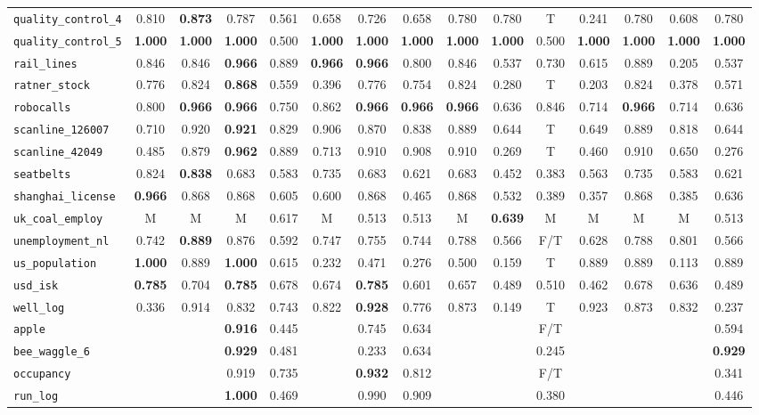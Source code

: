 \begin{tabular}{lcccccccccccccc}
\verb+quality_control_4+ & 0.810 & \textbf{0.873} & 0.787 & 0.561 & 0.658 & 0.726 & 0.658 & 0.780 & 0.780 & T & 0.241 & 0.780 & 0.608 & 0.780\\
\verb+quality_control_5+ & \textbf{1.000} & \textbf{1.000} & \textbf{1.000} & 0.500 & \textbf{1.000} & \textbf{1.000} & \textbf{1.000} & \textbf{1.000} & \textbf{1.000} & 0.500 & \textbf{1.000} & \textbf{1.000} & \textbf{1.000} & \textbf{1.000}\\
\verb+rail_lines+ & 0.846 & 0.846 & \textbf{0.966} & 0.889 & \textbf{0.966} & \textbf{0.966} & 0.800 & 0.846 & 0.537 & 0.730 & 0.615 & 0.889 & 0.205 & 0.537\\
\verb+ratner_stock+ & 0.776 & 0.824 & \textbf{0.868} & 0.559 & 0.396 & 0.776 & 0.754 & 0.824 & 0.280 & T & 0.203 & 0.824 & 0.378 & 0.571\\
\verb+robocalls+ & 0.800 & \textbf{0.966} & \textbf{0.966} & 0.750 & 0.862 & \textbf{0.966} & \textbf{0.966} & \textbf{0.966} & 0.636 & 0.846 & 0.714 & \textbf{0.966} & 0.714 & 0.636\\
\verb+scanline_126007+ & 0.710 & 0.920 & \textbf{0.921} & 0.829 & 0.906 & 0.870 & 0.838 & 0.889 & 0.644 & T & 0.649 & 0.889 & 0.818 & 0.644\\
\verb+scanline_42049+ & 0.485 & 0.879 & \textbf{0.962} & 0.889 & 0.713 & 0.910 & 0.908 & 0.910 & 0.269 & T & 0.460 & 0.910 & 0.650 & 0.276\\
\verb+seatbelts+ & 0.824 & \textbf{0.838} & 0.683 & 0.583 & 0.735 & 0.683 & 0.621 & 0.683 & 0.452 & 0.383 & 0.563 & 0.735 & 0.583 & 0.621\\
\verb+shanghai_license+ & \textbf{0.966} & 0.868 & 0.868 & 0.605 & 0.600 & 0.868 & 0.465 & 0.868 & 0.532 & 0.389 & 0.357 & 0.868 & 0.385 & 0.636\\
\verb+uk_coal_employ+ & M & M & M & 0.617 & M & 0.513 & 0.513 & M & \textbf{0.639} & M & M & M & M & 0.513\\
\verb+unemployment_nl+ & 0.742 & \textbf{0.889} & 0.876 & 0.592 & 0.747 & 0.755 & 0.744 & 0.788 & 0.566 & F/T & 0.628 & 0.788 & 0.801 & 0.566\\
\verb+us_population+ & \textbf{1.000} & 0.889 & \textbf{1.000} & 0.615 & 0.232 & 0.471 & 0.276 & 0.500 & 0.159 & T & 0.889 & 0.889 & 0.113 & 0.889\\
\verb+usd_isk+ & \textbf{0.785} & 0.704 & \textbf{0.785} & 0.678 & 0.674 & \textbf{0.785} & 0.601 & 0.657 & 0.489 & 0.510 & 0.462 & 0.678 & 0.636 & 0.489\\
\verb+well_log+ & 0.336 & 0.914 & 0.832 & 0.743 & 0.822 & \textbf{0.928} & 0.776 & 0.873 & 0.149 & T & 0.923 & 0.873 & 0.832 & 0.237\\
\hline
\verb+apple+ &  &  & \textbf{0.916} & 0.445 &  & 0.745 & 0.634 &  &  & F/T &  &  &  & 0.594\\
\verb+bee_waggle_6+ &  &  & \textbf{0.929} & 0.481 &  & 0.233 & 0.634 &  &  & 0.245 &  &  &  & \textbf{0.929}\\
\verb+occupancy+ &  &  & 0.919 & 0.735 &  & \textbf{0.932} & 0.812 &  &  & F/T &  &  &  & 0.341\\
\verb+run_log+ &  &  & \textbf{1.000} & 0.469 &  & 0.990 & 0.909 &  &  & 0.380 &  &  &  & 0.446\\
\hline
\end{tabular}
